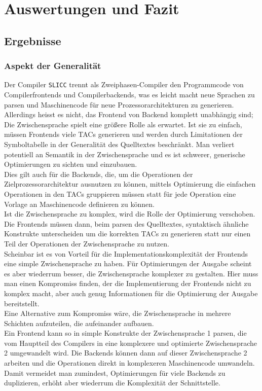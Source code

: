 \part{Auswertungen und Fazit}
\chapter{Ergebnisse}
\label{chap:fazit:results}

\section{Aspekt der Generalität}

Der Compiler \texttt{SLICC} trennt als Zweiphasen-Compiler den Programmcode von Compilerfrontends und Compilerbackends, was es leicht macht neue Sprachen zu parsen und Maschinencode für neue Prozessorarchitekturen zu generieren.\\
Allerdings heisst es nicht, das Frontend von Backend komplett unabhängig sind; 
Die Zwischensprache spielt eine größere Rolle als erwartet.
Ist sie zu einfach, müssen Frontends viele \acp{TAC} generieren und werden durch Limitationen der Symboltabelle in der Generalität des Quelltextes beschränkt. Man verliert potentiell an Semantik in der Zwischensprache und es ist schwerer, generische Optimierungen zu sichten und einzubauen.\\
Dies gilt auch für die Backends, die, um die Operationen der Zielprozessorarchitektur ausnutzen zu können, mittels Optimierung die einfachen Operationen in den \acp{TAC} gruppieren müssen statt für jede Operation eine Vorlage an Maschinencode definieren zu können.\\

Ist die Zwischensprache zu komplex, wird die Rolle der Optimierung verschoben. 
Die Frontends müssen dann, beim parsen des Quelltextes, syntaktisch ähnliche Konstrukte unterscheiden um die korrekten \acp{TAC} zu generieren statt nur einen Teil der Operationen der Zwischensprache zu nutzen.\\

Scheinbar ist es von Vorteil für die Implementationskomplexität der Frontends eine simple Zwischensprache zu haben.
Für Optimierungen der Ausgabe scheint es aber wiederrum besser, die Zwischensprache komplexer zu gestalten.
Hier muss man einen Kompromiss finden, der die Implementierung der Frontends nicht zu komplex macht, aber auch genug Informationen für die Optimierung der Ausgabe bereitstellt.\\
Eine Alternative zum Kompromiss wäre, die Zwischensprache in mehrere Schichten aufzuteilen, die aufeinander aufbauen.\\
Ein Frontend kann so in simple Konstrukte der Zwischensprache 1 parsen, die vom Hauptteil des Compilers in eine komplexere und optimierte Zwischensprache 2 umgewandelt wird.
Die Backends können dann auf dieser Zwischensprache 2 arbeiten und die Operationen direkt in komplexeren Maschinencode umwandeln.\\
Damit vermeidet man zumindest, Optimierungen für viele Backends zu duplizieren, erhöht aber wiederrum die Komplexität der Schnittstelle.\\

